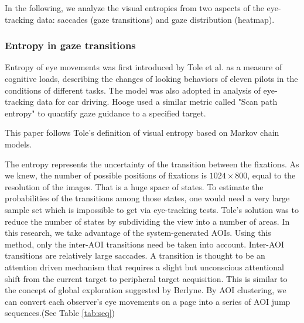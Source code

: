 In the following, we analyze the visual entropies from two aspects of the eye-tracking data: saccades (gaze transitions) and gaze distribution (heatmap).

\subsubsection{Entropy in gaze transitions}
Entropy of eye movements was first introduced by Tole et al.\cite{Tole1983} as a measure of cognitive loads, describing the changes of looking behaviors of eleven pilots in the conditions of different tasks. The model was also adopted in analysis of eye-tracking data for car driving\cite{Gilland2008}. Hooge\cite{Hooge2013} used a similar metric called "Scan path entropy" to quantify gaze guidance to a specified target.

This paper follows Tole's definition of visual entropy based on Markov chain models.

The entropy represents the uncertainty of the transition between the fixations. As we knew, the number of possible positions of fixations is $1024\times800$, equal to the resolution of the images. That is a huge space of states. To estimate the probabilities of the transitions among those states, one would need a very large sample set which is impossible to get via eye-tracking tests. Tole's solution was to reduce the number of states by subdividing the view into a number of areas. In this research, we take advantage of the system-generated AOIs. Using this method, only the inter-AOI transitions need be taken into account. Inter-AOI transitions are relatively large saccades. A transition is thought to be an attention driven mechanism that requires a slight but unconscious attentional shift from the current target to peripheral target acquisition\cite{Henderson1993}. This is similar to the concept of global exploration suggested by Berlyne\cite{Berlyne1971}. By AOI clustering, we can convert each observer's eye movements on a page into a series of AOI jump sequences.(See Table \ref{tab:seq})

